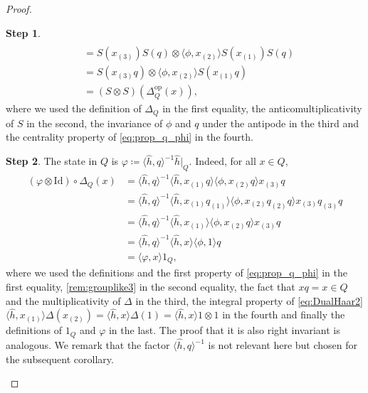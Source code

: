 \documentclass[a4paper,10pt]{amsart}
\newcommand{\eval}[2]{\langle #1 , #2\rangle}
\theoremstyle{definition}
\newtheorem{step-hypergroup}{Step}
\begin{document}
\begin{proof}
\begin{step-hypergroup}
\begin{align*}
    \\
    &=
        S(x_{(3)}) S(q)
            \otimes \eval{ \phi }{ x_{(2)} } S(x_{(1)}) S(q)
    \\
    &=
        S( x_{(3)} q )
            \otimes \eval{ \phi }{ x_{(2)} } S( x_{(1)} q )
    \\
    &=
        (S\otimes S)(\Delta_Q^{\mathrm{op}}(x)),
\end{align*}
where we used the definition of $\Delta_Q$ in the first equality, the anticomultiplicativity of $S$ in the second, the invariance of $\phi$ and $q$ under the antipode in the third and the centrality property of \cref{eq:prop_q_phi} in the fourth.
\end{step-hypergroup}
\begin{step-hypergroup}
    The state in $Q$ is $\varphi \coloneqq \eval{\hat{h}}{q}^{-1} \hat{h}|_Q$.
    Indeed, for all $x\in Q$,
    \begin{align*}
        (\varphi \otimes \mathrm{Id}) \circ \Delta_Q(x)
        &=
            \eval{\hat{h}}{q}^{-1} \eval{\hat{h}}{x_{(1)}q}
                \eval{\phi}{x_{(2)}q} x_{(3)} q
        \\ &
        =
            \eval{\hat{h}}{q}^{-1} \eval{\hat{h}}{x_{(1)} q_{(1)}}
                \eval{\phi}{x_{(2)}q_{(2)} q} x_{(3)} q_{(3)} q
        \\ &
        =
            \eval{\hat{h}}{q}^{-1} \eval{\hat{h}}{x_{(1)}}
                \eval{\phi}{x_{(2)} q} x_{(3)} q
        \\ &
        =
            \eval{\hat{h}}{q}^{-1} \eval{\hat{h}}{x}
                \eval{\phi}{1} q
        \\ &
        =
        \eval{\varphi}{x} 1_Q,
    \end{align*}
    where we used the definitions and the first property of \cref{eq:prop_q_phi} in the first equality, \cref{rem:grouplike3} in the second equality, the fact that $xq=x\in Q$ and the multiplicativity of $\Delta$ in the third, the integral property of \cref{eq:DualHaar2} $\eval{\hat{h}}{x_{(1)}}\Delta(x_{(2)})=\eval{\hat{h}}{x}\Delta(1)=\eval{\hat{h}}{x} 1\otimes 1$ in the fourth and finally the definitions of $1_Q$ and $\varphi$ in the last. The proof that it is also right invariant is analogous. We remark that the factor $\eval{\hat{h}}{q}^{-1}$ is not relevant here but chosen for the subsequent corollary.
\end{step-hypergroup}

\end{proof}
\end{document}
